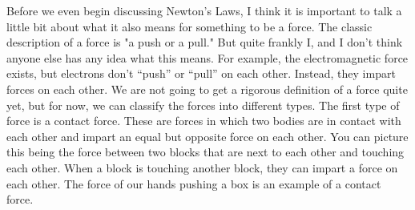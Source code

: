 
Before we even begin discussing Newton’s Laws, I think it is important to talk a little bit about what it also means for something to be a force. The classic description of a force is "a push or a pull." But quite frankly I, and I don't think anyone else has any idea what this means. For example, the electromagnetic force exists, but electrons don’t “push” or “pull” on each other. Instead, they impart forces on each other. We are not going to get a rigorous definition of a force quite yet, but for now, we can classify the forces into different types. The first type of force is a contact force. These are forces in which two bodies are in contact with each other and impart an equal but opposite force on each other. You can picture this being the force between two blocks that are next to each other and touching each other. When a block is touching another block, they can impart a force on each other. The force of our hands pushing a box is an example of a contact force. 

